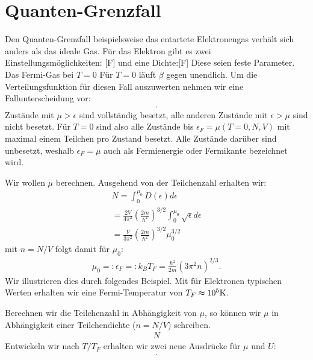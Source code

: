 \section{Quanten-Grenzfall}
Den Quanten-Grenzfall beispielsweise das entartete Elektronengas verhält sich anders als das ideale Gas.
Für das Elektron gibt es zwei Einstellungsmöglichkeiten: [F] und eine Dichte:[F]
Diese seien feste Parameter.
Das Fermi-Gas bei $T=0$
Für $T=0$ läuft $\beta$ gegen unendlich. Um die Verteilungsfunktion für diesen Fall auszuwerten nehmen wir eine Fallunterscheidung vor:
\begin{align*}
    .
\end{align*} 
Zustände mit $\mu>\epsilon$ sind vollständig besetzt, alle anderen Zustände mit $\epsilon>\mu$ sind nicht besetzt.
Für $T=0$ sind also alle Zustände bis $\epsilon_F=\mu(T=0,N,V)$ mit maximal einem Teilchen pro Zustand besetzt. Alle Zustände darüber sind unbesetzt, weshalb $\epsilon_F=\mu$ auch als Fermienergie oder Fermikante bezeichnet wird.

Wir wollen $\mu$ berechnen.
Ausgehend von der Teilchenzahl erhalten wir:
\begin{align*}
    N=\int_0^{\mu_0} D(\epsilon)d\epsilon\\
    =\frac{2V}{4\pi^2}\left(\frac{2m}{\hbar^2}\right)^{3/2}\int_0 ^{\mu_0} \sqrt{\epsilon}d\epsilon\\
    =\frac{V}{3\pi^2}\left(\frac{2m}{\hbar^2}\right)^{3/2}\mu_0 ^{3/2}
\end{align*}
mit $n=N/V$ folgt damit für $\mu_0$:
\begin{align*}
    \mu_0=:\epsilon_F=:k_B T_F=\frac{\hbar^2}{2m}\left(3\pi^2 n\right)^{2/3}.
\end{align*}
Wir illustrieren dies durch folgendes Beispiel.
Mit für Elektronen typischen Werten erhalten wir eine Fermi-Temperatur von $T_F\thickapprox 10^5 \si{K}$.

Berechnen wir die Teilchenzahl in Abhängigkeit von $\mu$, so können wir $\mu$ in Abhängigkeit einer Teilchendichte ($n=N/V$) schreiben.
\begin{align*}
    N
\end{align*}
Entwickeln wir nach $T/T_F$ erhalten wir zwei neue Ausdrücke für $\mu$ und $U$:
\begin{align*}
    .
\end{align*}
